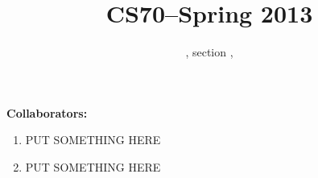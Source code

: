 \documentclass[11pt]{article}
\title{CS70--Spring 2013}
\author{\Name, section \Sec, \texttt{\Login}}
\begin{document}
\maketitle

\textbf{Collaborators:} %

\begin{enumerate}
  \item 
    PUT SOMETHING HERE
    \newpage
  \item
    PUT SOMETHING HERE
    \newpage

\end{enumerate}
\end{document}
